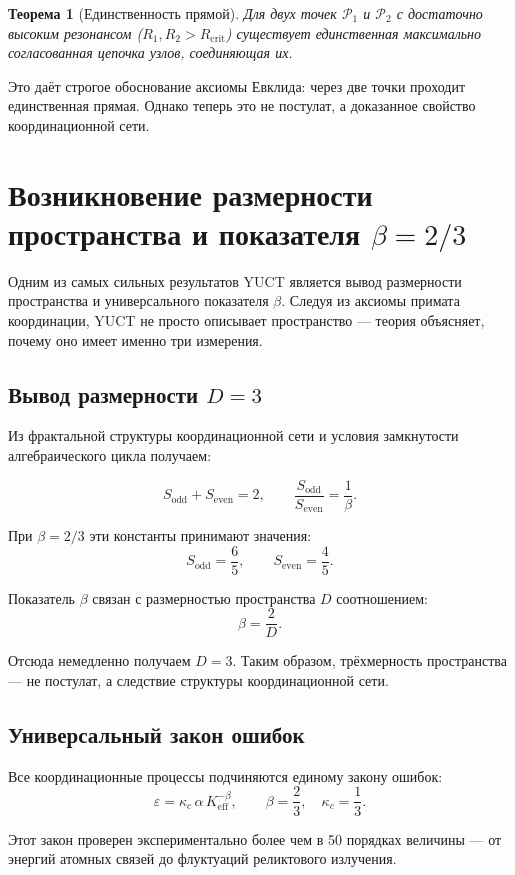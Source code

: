 \documentclass[12pt,a4paper]{article}
\newtheorem{theorem}{Теорема}
\newcommand{\Keff}{K_{\mathrm{eff}}}
\newcommand{\kappac}{\kappa_c}
\newcommand{\eps}{\varepsilon}
\newcommand{\betaf}{\beta}
\newcommand{\Sodd}{S_{\mathrm{odd}}}
\newcommand{\Seven}{S_{\mathrm{even}}}
\newcommand{\Rcrit}{R_{\mathrm{crit}}}
\newcommand{\calP}{\mathcal{P}}
\begin{document}
	\begin{theorem}[Единственность прямой]
		Для двух точек \(\calP_1\) и \(\calP_2\) с достаточно высоким резонансом (\(R_1, R_2 > \Rcrit\)) существует единственная максимально согласованная цепочка узлов, соединяющая их.
	\end{theorem}
	
	Это даёт строгое обоснование аксиомы Евклида: через две точки проходит единственная прямая. Однако теперь это не постулат, а доказанное свойство координационной сети.
	
	\section{Возникновение размерности пространства и показателя \(\betaf = 2/3\)}
	
	Одним из самых сильных результатов YUCT является вывод размерности пространства и универсального показателя \(\betaf\). Следуя из аксиомы примата координации, YUCT не просто описывает пространство — теория объясняет, почему оно имеет именно три измерения.
	
	\subsection{Вывод размерности \(D=3\)}
	
	Из фрактальной структуры координационной сети и условия замкнутости алгебраического цикла получаем:
	
	\[
	\Sodd + \Seven = 2, \qquad \frac{\Sodd}{\Seven} = \frac{1}{\betaf}.
	\]
	
	При \(\betaf = 2/3\) эти константы принимают значения:
	\[
	\Sodd = \frac{6}{5}, \qquad \Seven = \frac{4}{5}.
	\]
	
	Показатель \(\betaf\) связан с размерностью пространства \(D\) соотношением:
	\[
	\betaf = \frac{2}{D}.
	\]
	
	Отсюда немедленно получаем \(D = 3\). Таким образом, трёхмерность пространства — не постулат, а следствие структуры координационной сети.
	
	\subsection{Универсальный закон ошибок}
	
	Все координационные процессы подчиняются единому закону ошибок:
	\[
	\eps = \kappac\,\alpha\,\Keff^{-\betaf}, \qquad \betaf = \frac{2}{3}, \quad \kappac = \frac{1}{3}.
	\]
	
	Этот закон проверен экспериментально более чем в 50 порядках величины — от энергий атомных связей до флуктуаций реликтового излучения.
	
\end{document}
